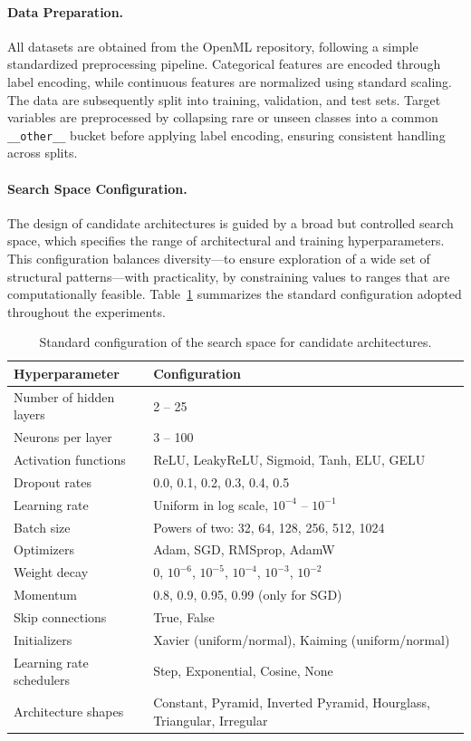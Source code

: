 \documentclass[stu,12pt,floatsintext,doublespacing]{apa7}
\begin{document}
\paragraph{Data Preparation.}
All datasets are obtained from the OpenML repository, following a simple standardized preprocessing pipeline. Categorical features are encoded through label encoding, while continuous features are normalized using standard scaling. The data are subsequently split into training, validation, and test sets. Target variables are preprocessed by collapsing rare or unseen classes into a common \texttt{\_\_other\_\_} bucket before applying label encoding, ensuring consistent handling across splits.

\paragraph{Search Space Configuration.}
The design of candidate architectures is guided by a broad but controlled search space, which specifies the range of architectural and training hyperparameters. This configuration balances diversity---to ensure exploration of a wide set of structural patterns---with practicality, by constraining values to ranges that are computationally feasible. Table~\ref{tab:search_space} summarizes the standard configuration adopted throughout the experiments.

\begin{table}[H]
\centering
\caption{Standard configuration of the search space for candidate architectures.}
\label{tab:search_space}
\begin{tabular}{p{5cm} p{10cm}}
\hline
\textbf{Hyperparameter} & \textbf{Configuration} \\
\hline
Number of hidden layers & 2 -- 25 \\
Neurons per layer & 3 -- 100 \\
Activation functions & ReLU, LeakyReLU, Sigmoid, Tanh, ELU, GELU \\
Dropout rates & 0.0, 0.1, 0.2, 0.3, 0.4, 0.5 \\
Learning rate & Uniform in log scale, $10^{-4}$ -- $10^{-1}$ \\
Batch size & Powers of two: 32, 64, 128, 256, 512, 1024 \\
Optimizers & Adam, SGD, RMSprop, AdamW \\
Weight decay & 0, $10^{-6}$, $10^{-5}$, $10^{-4}$, $10^{-3}$, $10^{-2}$ \\
Momentum & 0.8, 0.9, 0.95, 0.99 (only for SGD) \\
Skip connections & True, False \\
Initializers & Xavier (uniform/normal), Kaiming (uniform/normal) \\
Learning rate schedulers & Step, Exponential, Cosine, None \\
Architecture shapes & Constant, Pyramid, Inverted Pyramid, Hourglass, Triangular, Irregular \\
\hline
\end{tabular}
\end{table}
\end{document}
